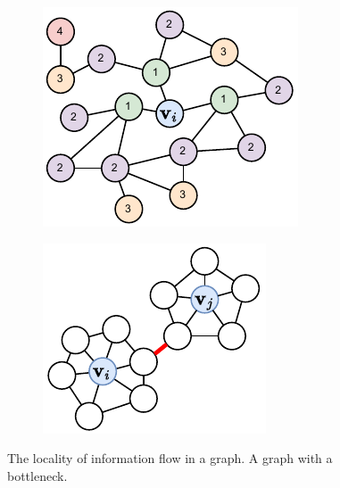 \begin{figure}
    \centering
    \begin{subfigure}[b]{0.3\textwidth}
        \centering
        \includegraphics[width=\textwidth]{Figures/transformers/neighbours.pdf}
        \caption{}
        \label{fig:neighbours}
    \end{subfigure}
    \begin{subfigure}[b]{0.3\textwidth}
        \centering
        \includegraphics[width=\textwidth]{Figures/transformers/bottleneck.pdf}
        \caption{}
        \label{fig:bottleneck}
    \end{subfigure}
    \caption{ The locality of information flow in a graph.  A graph with a bottleneck.}
    \label{fig:over_squashing}
\end{figure}

